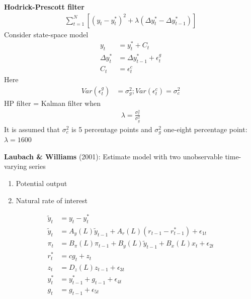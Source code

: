 \documentclass{beamer}
\begin{document}
\begin{frame}
  \textbf{Hodrick-Prescott filter}
  \begin{align}
    \sum_{t=1}^{N} [(y_t - y_t^*)^2+ \lambda(\Delta y_t^* - \Delta y_{t-1}^*)]
  \end{align}
  Consider state-space model
  \begin{align}
    y_t &= y^*_t+C_t\\
    \Delta y^*_t &= \Delta y^*_{t-1} + \epsilon^g_t \\
    C_t &= \epsilon_t^c
  \end{align}
  Here
  \begin{align}
    Var(\epsilon^g_t) &= \sigma_g^2; Var(\epsilon_t^c) = \sigma_c^2
  \end{align}
  HP filter = Kalman filter when
  \begin{align}
    \lambda = \frac{\sigma_c^2}{\sigma_g^2} 
  \end{align}
  It is assumed that $\sigma_c^2$ is 5 percentage points and $\sigma_g^2$ one-eight percentage point: $\lambda=1600$
\end{frame}

\begin{frame}
  \textbf{Laubach \& Williams} (2001): Estimate model with two unobservable time-varying series
  \begin{enumerate}
    \item Potential output
    \item Natural rate of interest
  \end{enumerate}
  \begin{align*}
    \tilde{y}_t &= y_t-y^*_t \\ 
    \tilde{y}_t &= A_y(L)\tilde{y}_{t-1} + A_r(L)(r_{t-1}-r^*_{t-1}) + \epsilon_{1t}\\
    \pi_t &= B_{\pi}(L)\pi_{t-1} + B_y(L)\tilde{y}_{t-1} + B_x(L)x_t + \epsilon_{2t}\\
    r^*_t &= cg_t +z_t\\
    z_t &= D_z(L)z_{t-1} + \epsilon_{3t}\\
    y^*_t &= y^*_{t-1} +g_{t-1} + \epsilon_{4t}\\
    g_t &= g_{t-1} + \epsilon_{5t}
  \end{align*}
\end{frame}
\end{document}
